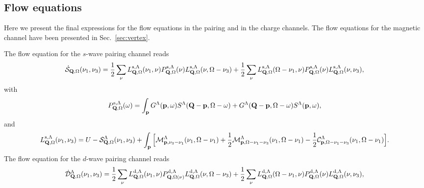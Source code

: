
\begin{widetext}

\section{Flow equations}
\label{sec:FlowEquations}

Here we present the final expressions for the flow equations in the pairing and in the charge channels. The flow equations for the magnetic channel have been presented in
Sec.~\ref{sec:vertex}.

The flow equation for the $s$-wave pairing channel reads
\begin{equation}
\dot{\mathcal{S}}_{\mathbf{Q},\Omega}(\nu_1,\nu_3) = 
  \frac{1}{2} \sum_\nu L^{\mathrm{s},\Lambda}_{\mathbf{Q},\Omega}(\nu_1,\nu) P^{\mathrm{s},\Lambda}_{\mathbf{Q},\Omega}(\nu)
  L^{\mathrm{s},\Lambda}_{\mathbf{Q},\Omega}(\nu,\Omega-\nu_3) +
 \frac{1}{2} \sum_\nu L^{\mathrm{s},\Lambda}_{\mathbf{Q},\Omega}(\Omega-\nu_1,\nu)
 P^{\mathrm{s},\Lambda}_{\mathbf{Q},\Omega}(\nu)
 L^{\mathrm{s},\Lambda}_{\mathbf{Q},\Omega}(\nu,\nu_3),
\end{equation}  
with
\begin{equation}
 P^{\mathrm{s},\Lambda}_{\mathbf{Q},\Omega}(\omega) = \int_{\mathbf{p}}
 G^{\Lambda}(\mathbf{p},\omega)S^{\Lambda}(\mathbf{Q}-\mathbf{p},\Omega-\omega) +
 G^{\Lambda}(\mathbf{Q}-\mathbf{p},\Omega-\omega) S^{\Lambda}(\mathbf{p},\omega), 
\label{eq:app:P_pp_s}
\end{equation} 
and
\begin{align} 
\label{eq:Lswave}
 L^{\mathrm{s},\Lambda}_{\mathbf{Q},\Omega}(\nu_1,\nu_3) = U-\mathcal{S}^{\Lambda}_{\mathbf{Q},\Omega} (\nu_1,\nu_3) +
 \int_{\mathbf{p}} \Big[ \mathcal{M}^{\Lambda}_{\mathbf{p},\nu_3-\nu_1}(\nu_1,\Omega-\nu_1) + \frac{1}{2} \mathcal{M}^{\Lambda}_{\mathbf{p},\Omega-\nu_1-\nu_3}(\nu_1,\Omega-\nu_1) -
 \frac{1}{2} \mathcal{C}^{\Lambda}_{\mathbf{p},\Omega-\nu_1-\nu_3}(\nu_1,\Omega-\nu_1) \Big]. 
\end{align}	 
The flow equation for the $d$-wave pairing channel reads
\begin{equation}
 \dot{\mathcal{D}}^{\Lambda}_{\bs{Q},\Omega}(\nu_1,\nu_3) = 
 \frac{1}{2} \sum_\nu L^{\mathrm{d},\Lambda}_{\bs{Q},\Omega}(\nu_1,\nu)
 P^{\mathrm{d},\Lambda}_{\bs{Q},\Omega(\nu)}
 L^{\mathrm{d},\Lambda}_{\bs{Q},\Omega} (\nu,\Omega-\nu_3) + 
 \frac{1}{2} \sum_\nu L^{\mathrm{d},\Lambda}_{\bs{Q},\Omega}(\Omega-\nu_1,\nu)
 P^{\mathrm{d},\Lambda}_{\bs{Q},\Omega}(\nu)
 L^{\mathrm{d},\Lambda}_{\bs{Q},\Omega}(\nu,\nu_3),

\end{equation}
\end{widetext}
